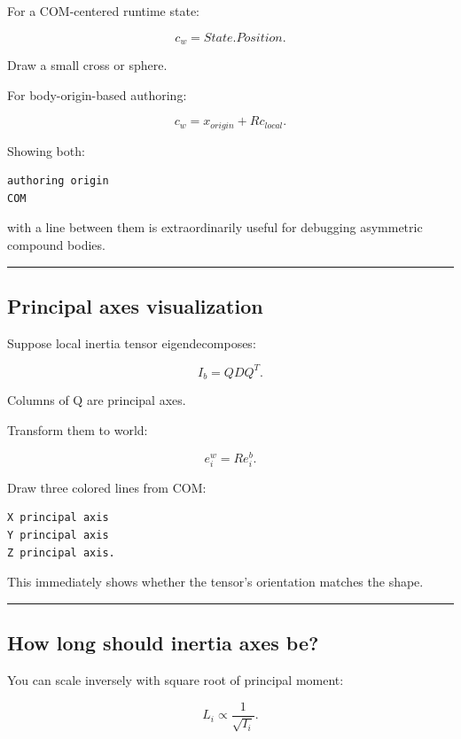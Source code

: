 For a COM-centered runtime state:

\[
c_w=
State.Position.
\]

Draw a small cross or sphere.

For body-origin-based authoring:

\[
c_w
=
x_{origin}
+
R c_{local}.
\]

Showing both:

\begin{verbatim}
authoring origin
COM
\end{verbatim}

with a line between them is extraordinarily useful for debugging asymmetric compound bodies.

\begin{center}\rule{0.5\linewidth}{0.5pt}\end{center}

\subsection{Principal axes visualization}\label{06-engine-ii-ch039-principal-axes-visualization}

Suppose local inertia tensor eigendecomposes:

\[
I_b=QDQ^T.
\]

Columns of Q are principal axes.

Transform them to world:

\[
e_i^w=R e_i^b.
\]

Draw three colored lines from COM:

\begin{verbatim}
X principal axis
Y principal axis
Z principal axis.
\end{verbatim}

This immediately shows whether the tensor's orientation matches the shape.

\begin{center}\rule{0.5\linewidth}{0.5pt}\end{center}

\subsection{How long should inertia axes be?}\label{06-engine-ii-ch039-how-long-should-inertia-axes-be}

You can scale inversely with square root of principal moment:

\[
L_i
\propto
\frac1{\sqrt{I_i}}.
\]

